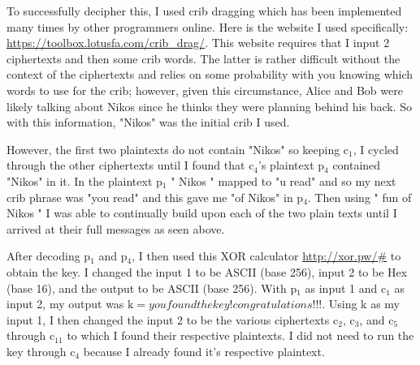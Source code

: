 \documentclass[11pt]{article}
\begin{document}
	To successfully decipher this, I used crib dragging which has been implemented many times by other programmers online. Here is the website I used specifically: \href{https://toolbox.lotusfa.com/crib_drag/}{https://toolbox.lotusfa.com/crib\_drag/}. This website requires that I input 2 ciphertexts and then some crib words. The latter is rather difficult without the context of the ciphertexts and relies on some probability with you knowing which words to use for the crib; however, given this circumstance, Alice and Bob were likely talking about Nikos since he thinks they were planning behind his back. So with this information, "Nikos" was the initial crib I used. 

	However, the first two plaintexts do not contain "Nikos" so keeping c$_1$, I cycled through the other ciphertexts until I found that c$_4$'s plaintext p$_4$ contained "Nikos" in it. In the plaintext p$_1$ " Nikos " mapped to "u read" and so my next crib phrase was "you read" and this gave me "of Nikos" in p$_4$. Then using " fun of Nikos " I was able to continually build upon each of the two plain texts until I arrived at their full messages as seen above.

	After decoding p$_1$ and p$_4$, I then used this XOR calculator \href{http://xor.pw/#}{http://xor.pw/\#} to obtain the key. I changed the input 1 to be ASCII (base 256), input 2 to be Hex (base 16), and the output to be ASCII (base 256). With p$_1$ as input 1 and c$_1$ as input 2, my output was $\text{k} = youfoundthekey!congratulations!!!$. Using k as my input 1, I then changed the input 2 to be the various ciphertexts c$_2$, c$_3$, and c$_5$ through c$_{11}$ to which I found their respective plaintexts. I did not need to run the key through c$_4$ because I already found it's respective plaintext.


\end{document}
